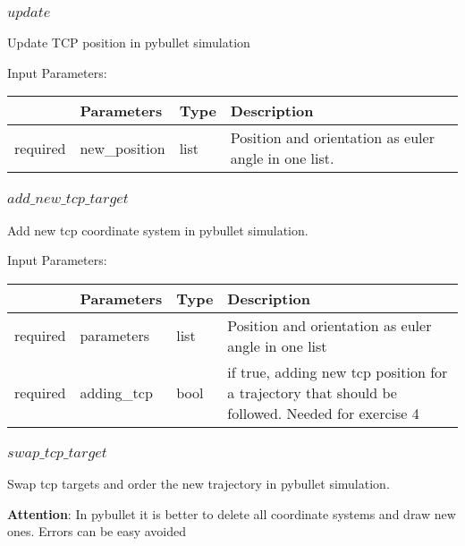 \documentclass[
	ngerman,
	accentcolor=9c,%
	type=intern,
	marginpar=false
	]{tudapub}
\begin{document}
\subsubsection{$update$}
\noindent Update TCP position in pybullet simulation

\vspace{0.5cm}
\noindent Input Parameters:
\vspace{0.5cm}

\begin{tabular}{|p{}|p{}|p{}| p{}|}
\hline
 & \textbf{Parameters} & \textbf{Type} & \textbf{Description} \\
\hline
required & new\_position & list &  Position and orientation as euler angle in one list.\\
\hline
\end{tabular}
\vspace{1cm}

\subsubsection{$add\_new\_tcp\_target$}
\vspace{0.5cm}
\noindent Add new tcp coordinate system in pybullet simulation.

\vspace{0.5cm}
\noindent Input Parameters:
\vspace{0.5cm}

\begin{tabular}{|p{}|p{}|p{}| p{}|}
\hline
 & \textbf{Parameters} & \textbf{Type} & \textbf{Description} \\
\hline
required & parameters & list & Position and orientation as euler angle in one list \\
\hline
required & adding\_tcp & bool & if true, adding new tcp position for a trajectory that should be followed. Needed for exercise 4\\
\hline
\end{tabular}
\vspace{1cm}

\subsubsection{$swap\_tcp\_target$}
\noindent Swap tcp targets and order the new trajectory in pybullet simulation.

\vspace{0.2cm}
\noindent \textbf{Attention}: In pybullet it is better to delete all coordinate systems and draw new ones. Errors can be easy avoided
\end{document}
